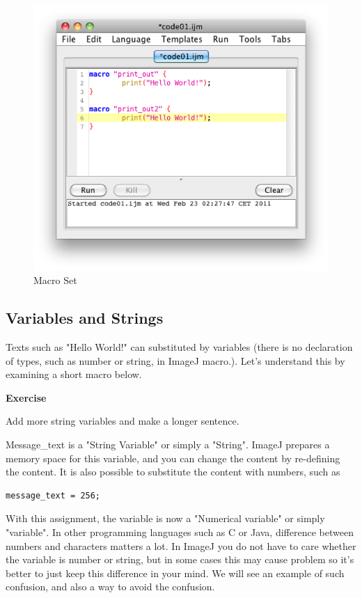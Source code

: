\documentclass[11pt,a4paper,oneside]{report}
\newenvironment{indentexercise}[1]%
{{\setlength{\leftmargin}{2em}}%
\textbf{Exercise \thesubsection-#1}%
\begin{list}{}%
	\item%
}
{\end{list}}
\begin{document}
\begin{figure}[htbp]
\begin{center}
\includegraphics[scale=0.6]{fig/editor_MacroSet.png}
\caption{Macro Set} \label{fig_MacroSetInMenu}
\end{center}
\end{figure}

\subsection{Variables and Strings}
Texts such as "Hello World!" can substituted by variables 
(there is no declaration of types, such as number or string, in ImageJ macro.).
Let's understand this by examining a short macro below.



\begin{indentexercise}{1}
\item Add more string variables and make a longer sentence.\\
\end{indentexercise}

Message\_text is a "String Variable" or simply a "String". 
ImageJ prepares a memory space for this variable, and you can change the content by re-defining the content. 
It is also possible to substitute the content with numbers, such as\\
\begin{lstlisting}[numbers=none]
message_text = 256;
\end{lstlisting}
With this assignment, the variable is now a "Numerical variable" or simply "variable". 
In other programming languages such as C or Java, difference between numbers and characters matters a lot. 
In ImageJ you do not have to care whether the variable is number or string, 
but in some cases this may cause problem 
so it's better to just keep this difference in your mind. We will see an example of such confusion, 
and also a way to avoid the confusion. 
\end{document}
